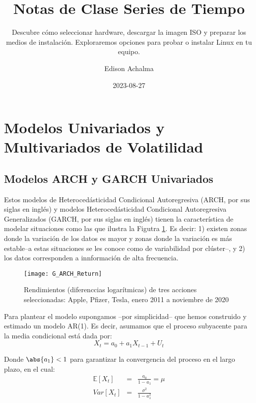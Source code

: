 \documentclass[
  a4paper,
]{article}
\title{Notas de Clase Series de Tiempo}
\subtitle{Descubre cómo seleccionar hardware, descargar la imagen ISO y
preparar los medios de instalación. Exploraremos opciones para probar o
instalar Linux en tu equipo.}
\author{Edison Achalma}
\date{2023-08-27}
\begin{document}
\maketitle
\ifdefined\Shaded\renewenvironment{Shaded}{\begin{tcolorbox}[borderline west={3pt}{0pt}{shadecolor}, breakable, frame hidden, sharp corners, enhanced, interior hidden, boxrule=0pt]}{\end{tcolorbox}}\fi

\hypertarget{modelos-univariados-y-multivariados-de-volatilidad}{%
\section{Modelos Univariados y Multivariados de
Volatilidad}\label{modelos-univariados-y-multivariados-de-volatilidad}}

\hypertarget{modelos-arch-y-garch-univariados}{%
\subsection{Modelos ARCH y GARCH
Univariados}\label{modelos-arch-y-garch-univariados}}

Estos modelos de Heterocedásticidad Condicional Autoregresiva (ARCH, por
sus siglas en inglés) y modelos Heterocedásticidad Condicional
Autoregresiva Generalizados (GARCH, por sus siglas en inglés) tienen la
característica de modelar situaciones como las que ilustra la Figutra
\ref{G_ARCH_Return}. Es decir: 1) existen zonas donde la variación de
los datos es mayor y zonas donde la variación es más estable--a estas
situaciones se les conoce como de variabilidad por clúster--, y 2) los
datos corresponden a innformación de alta frecuencia.

\begin{figure}
  \centering
    \texttt{[image: G\_ARCH\_Return]}
  \caption{ Rendimientos (diferenccias logarítmicas) de tres acciones seleccionadas: Apple, Pfizer, Tesla, enero 2011 a noviembre de 2020}
  \label{G_ARCH_Return}
\end{figure}

Para plantear el modelo supongamos --por simplicidad-- que hemos
construido y estimado un modelo AR(1). Es decir, asumamos que el proceso
subyacente para la media condicional está dada por: \[
    X_t = a_0 + a_1 X_{t-1} + U_t
\]

Donde \(\abs{a_1} < 1\) para garantizar la convergencia del proceso en
el largo plazo, en el cual: \begin{eqnarray*}
    \mathbb{E}[X_t] & = & \frac{a_0 }{1 - a_1} = \mu \\
    Var[X_t] & = & \frac{\sigma^2}{1 - a_1^2}
\end{eqnarray*}
\end{document}
